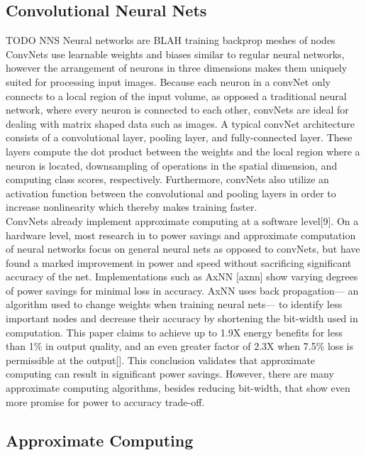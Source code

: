 \documentclass[journal]{IEEEtran}
\begin{document}
\subsection{Convolutional Neural Nets}
TODO NNS
	\indent Neural networks are BLAH training backprop meshes of nodes\\
	
	\indent ConvNets use learnable weights and biases similar to regular neural networks, however the arrangement of neurons in three dimensions makes them uniquely suited for processing input images. Because each neuron in a convNet only connects to a local region of the input volume, as opposed a traditional neural network, where every neuron is connected to each other, convNets are ideal for dealing with matrix shaped data such as images.  A typical convNet architecture consists of a convolutional layer, pooling layer, and fully-connected layer. These layers compute the dot product between the weights and the local region where a neuron is located, downsampling of operations in the spatial dimension, and computing class scores, respectively. Furthermore, convNets also utilize an activation function between the convolutional and pooling layers in order to increase nonlinearity which thereby makes training faster. \\
	
	\indent ConvNets already implement approximate computing at a software level[9]. On a hardware level, most research in to power savings and approximate computation of neural networks focus on general neural nets as opposed to convNets, but have found a marked improvement in power and speed without sacrificing significant accuracy of the net. Implementations such as AxNN [axnn] show varying degrees of power savings for minimal loss in accuracy. AxNN uses back propagation--- an algorithm used to change weights when training neural nets--- to identify less important nodes and decrease their accuracy by shortening the bit-width used in computation. This paper claims to achieve up to 1.9X energy benefits for less than 1\% in output quality, and an even greater factor of 2.3X when 7.5\% loss is permissible at the output[]. This conclusion validates that approximate computing can result in significant power savings. However, there are many approximate computing algorithms, besides reducing bit-width, that show even more promise for power to accuracy trade-off.

\subsection{Approximate Computing}
\end{document}
